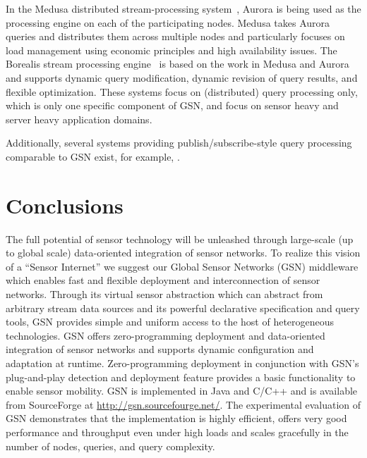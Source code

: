 In the Medusa distributed stream-processing system~\cite{Zdonik03}, Aurora is
being used as the processing engine on each of the participating nodes. Medusa
takes Aurora queries and distributes them across multiple nodes and
particularly focuses on load management using economic principles and high
availability issues. The Borealis stream processing engine~\cite{Abadi05} is
based on the work in Medusa and Aurora and supports dynamic query modification,
dynamic revision of query results, and flexible optimization. These systems
focus on (distributed) query processing only, which is only one specific
component of GSN, and focus on sensor heavy and server heavy application
domains.

Additionally, several systems providing publish/subscribe-style query
processing comparable to GSN exist, for example, \cite{Gray05}.

\section{Conclusions}
\label{sec:conclusions}

The full potential of sensor technology will be unleashed through large-scale
(up to global scale) data-oriented integration of sensor networks. To realize
this vision of a ``Sensor Internet'' we suggest our Global Sensor Networks
(GSN) middleware which enables fast and flexible deployment and interconnection
of sensor networks. Through its virtual sensor abstraction which can abstract
from arbitrary stream data sources and its powerful declarative specification
and query tools, GSN provides simple and uniform access to the host of
heterogeneous technologies. GSN offers zero-programming deployment and
data-oriented integration of sensor networks and supports dynamic configuration
and adaptation at runtime. Zero-programming deployment in conjunction with
GSN's plug-and-play detection and deployment feature provides a basic
functionality to enable sensor mobility. GSN is implemented in Java and C/C++
and is available from SourceForge at \url{http://gsn.sourcefourge.net/}.
The experimental evaluation of GSN demonstrates that the implementation is
highly efficient, offers very good performance and throughput even under high
loads and scales gracefully in the number of nodes, queries, and query
complexity.




